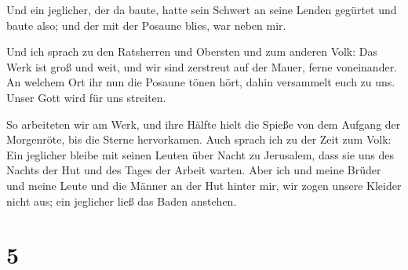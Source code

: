  Und ein jeglicher, der da baute, hatte sein Schwert an
seine Lenden gegürtet und baute also; und der mit der Posaune blies, war
neben mir.

 Und ich sprach zu den Ratsherren und Obersten und zum
anderen Volk: Das Werk ist groß und weit, und wir sind zerstreut auf der
Mauer, ferne voneinander.  An welchem Ort ihr nun die
Posaune tönen hört, dahin versammelt euch zu uns. Unser Gott wird für
uns streiten.

 So arbeiteten wir am Werk, und ihre Hälfte hielt die
Spieße von dem Aufgang der Morgenröte, bis die Sterne hervorkamen.
 Auch sprach ich zu der Zeit zum Volk: Ein jeglicher
bleibe mit seinen Leuten über Nacht zu Jerusalem, dass sie uns des
Nachts der Hut und des Tages der Arbeit warten.  Aber ich
und meine Brüder und meine Leute und die Männer an der Hut hinter mir,
wir zogen unsere Kleider nicht aus; ein jeglicher ließ das Baden
anstehen.

\hypertarget{section-4}{%
\section{5}\label{section-4}}

